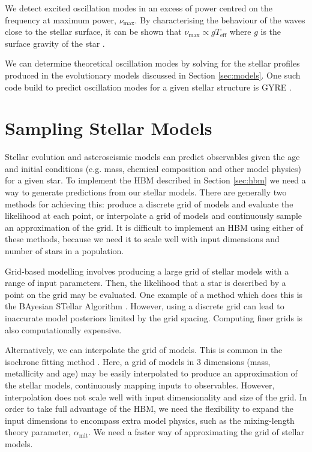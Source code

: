 We detect excited oscillation modes in an excess of power centred on the frequency at maximum power, $\nu_\mathrm{max}$. By characterising the behaviour of the waves close to the stellar surface, it can be shown that $\nu_\mathrm{max} \propto g T_\mathrm{eff}$ where $g$ is the surface gravity of the star \citep{Kjeldsen.Bedding1995}.

We can determine theoretical oscillation modes by solving for the stellar profiles produced in the evolutionary models discussed in Section \ref{sec:models}. One such code build to predict oscillation modes for a given stellar structure is GYRE \citep{Townsend.Teitler2013}. 

\section{Sampling Stellar Models}\label{sec:sample}

Stellar evolution and asteroseismic models can predict observables given the age and initial conditions (e.g. mass, chemical composition and other model physics) for a given star. To implement the HBM described in Section \ref{sec:hbm} we need a way to generate predictions from our stellar models. There are generally two methods for achieving this: produce a discrete grid of models and evaluate the likelihood at each point, or interpolate a grid of models and continuously sample an approximation of the grid. It is difficult to implement an HBM using either of these methods, because we need it to scale well with input dimensions and number of stars in a population.

Grid-based modelling involves producing a large grid of stellar models with a range of input parameters. Then, the likelihood that a star is described by a point on the grid may be evaluated. One example of a method which does this is the BAyesian STellar Algorithm \citep[BASTA;][]{SilvaAguirre.Davies.ea2015}. However, using a discrete grid can lead to inaccurate model posteriors limited by the grid spacing. Computing finer grids is also computationally expensive.

Alternatively, we can interpolate the grid of models. This is common in the isochrone fitting method \citep[see e.g.][]{Berger.Huber.ea2020}. Here, a grid of models in 3 dimensions (mass, metallicity and age) may be easily interpolated to produce an approximation of the stellar models, continuously mapping inputs to observables. However, interpolation does not scale well with input dimensionality and size of the grid. In order to take full advantage of the HBM, we need the flexibility to expand the input dimensions to encompass extra model physics, such as the mixing-length theory parameter, $\alpha_\mathrm{mlt}$. We need a faster way of approximating the grid of stellar models.

